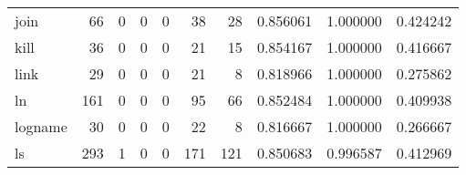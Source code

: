 \begin{longtable}{lrrrrrrrrr}
join      &                                        66 &                                                  0 &                                                  0 &                                                  0 &                                                 38 &                                                 28 &                                           0.856061 &                               1.000000 &                             0.424242 \\
kill      &                                        36 &                                                  0 &                                                  0 &                                                  0 &                                                 21 &                                                 15 &                                           0.854167 &                               1.000000 &                             0.416667 \\
link      &                                        29 &                                                  0 &                                                  0 &                                                  0 &                                                 21 &                                                  8 &                                           0.818966 &                               1.000000 &                             0.275862 \\
ln        &                                       161 &                                                  0 &                                                  0 &                                                  0 &                                                 95 &                                                 66 &                                           0.852484 &                               1.000000 &                             0.409938 \\
logname   &                                        30 &                                                  0 &                                                  0 &                                                  0 &                                                 22 &                                                  8 &                                           0.816667 &                               1.000000 &                             0.266667 \\
ls        &                                       293 &                                                  1 &                                                  0 &                                                  0 &                                                171 &                                                121 &                                           0.850683 &                               0.996587 &                             0.412969 \\

\end{longtable}
